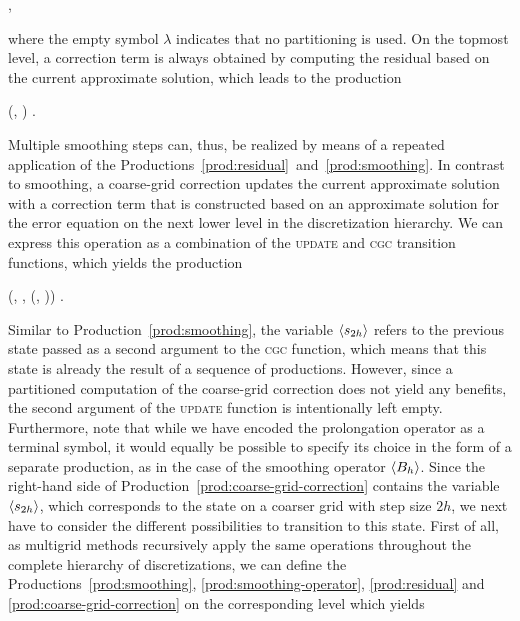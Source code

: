 \begin{production}
	 {
		 \bnfor \bnfes
	},
\label{prod:partitioning}
\end{production}
where the empty symbol $\lambda$ indicates that no partitioning is used. 
On the topmost level, a correction term is always obtained by computing the residual based on the current approximate solution, which leads to the production
\begin{production}
	 {
		(, \bnfsp {}) 
	}.
\label{prod:residual}
\end{production}
Multiple smoothing steps can, thus, be realized by means of a repeated application of the Productions~\eqref{prod:residual}~and~\eqref{prod:smoothing}.
In contrast to smoothing, a coarse-grid correction updates the current approximate solution with a correction term that is constructed based on an approximate solution for the error equation on the next lower level in the discretization hierarchy.
We can express this operation as a combination of the \textsc{update} and \textsc{cgc} transition functions, which yields the production
\begin{production}
	 {
		(\bnfts{$\omega$}, \bnfsp \bnfes, \bnfsp {}(, \bnfsp {}))
	}.
\label{prod:coarse-grid-correction}
\end{production}
Similar to Production~\eqref{prod:smoothing}, the variable $\langle s_{2h} \rangle$ refers to the previous state passed as a second argument to the \textsc{cgc} function, which means that this state is already the result of a sequence of productions.
However, since a partitioned computation of the coarse-grid correction does not yield any benefits, the second argument of the \textsc{update} function is intentionally left empty.
Furthermore, note that while we have encoded the prolongation operator as a terminal symbol, it would equally be possible to specify its choice in the form of a separate production, as in the case of the smoothing operator $\langle B_h \rangle$.
Since the right-hand side of Production~\eqref{prod:coarse-grid-correction} contains the variable $\langle s_{2h} \rangle$, which corresponds to the state on a coarser grid with step size $2h$, we next have to consider the different possibilities to transition to this state.
First of all, as multigrid methods recursively apply the same operations throughout the complete hierarchy of discretizations, we can define the Productions~\eqref{prod:smoothing}, \eqref{prod:smoothing-operator}, \eqref{prod:residual} and \eqref{prod:coarse-grid-correction} on the corresponding level which yields
